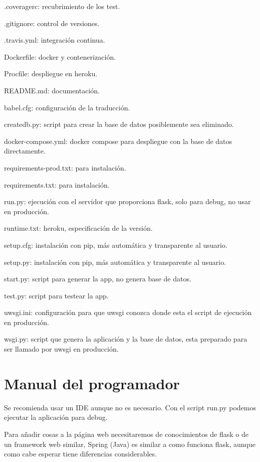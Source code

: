 \begin{list}{*}{}
\item .coveragerc: recubrimiento de los test.
\item .gitignore: control de versiones.
\item .travis.yml: integración continua.
\item Dockerfile: docker y contenerización.
\item Procfile: despliegue en heroku.
\item README.md: documentación.
\item babel.cfg: configuración de la traducción.
\item create\textunderscore db.py: script para crear la base de datos posiblemente sea eliminado.
\item docker-compose.yml: docker compose para despliegue con la base de datos directamente.
\item requirements-prod.txt: para instalación.
\item requirements.txt: para instalación.
\item run.py: ejecución con el servidor que proporciona flask, solo para debug, no usar en producción.
\item runtime.txt: heroku, especificación de la versión.
\item setup.cfg: instalación con pip, más automática y transparente al usuario. 
\item setup.py: instalación con pip, más automática y transparente al usuario. 
\item start.py: script para generar la app, no genera base de datos.
\item test.py: script para testear la app. 
\item uwsgi.ini: configuración para que uwsgi conozca donde esta el script de ejecución en producción.
\item wsgi.py: script que genera la aplicación y la base de datos, esta preparado para ser llamado por uwsgi en producción.
\end{list} 
\section{Manual del programador}

Se recomienda usar un IDE aunque no es necesario. Con el script run.py podemos ejecutar la aplicación para debug. 

Para añadir cosas a la página web necesitaremos de conocimientos de flask o de un framework web similar, Spring (Java) es similar a como funciona flask, aunque como cabe esperar tiene diferencias considerables.

